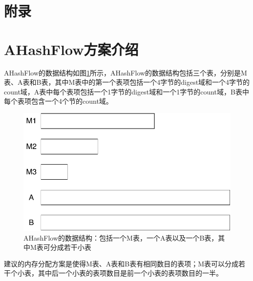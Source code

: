 \documentclass{article}
\begin{document}
\appendix
\section*{附录}
\section{AHashFlow方案介绍}
AHashFlow的数据结构如图\ref{fig:ahashflow}所示，AHashFlow的数据结构包括三个表，分别是M表、A表和B表，其中M表中的第一个表项包括一个4字节的digest域和一个4字节的count域，A表中每个表项包括一个1字节的digest域和一个1字节的count域，B表中每个表项包含一个4个节的count域。
\begin{figure}[ht!]
	\centering
	\includegraphics[width=0.7\linewidth]{./figures/AHashFlowDataStructure/AHashFlow}
	\caption{AHashFlow的数据结构：包括一个M表，一个A表以及一个B表，其中M表可分成若干小表}
	\label{fig:ahashflow}
\end{figure}

建议的内存分配方案是使得M表、A表和B表有相同数目的表项；M表可以分成若干个小表，其中后一个小表的表项数目是前一个小表的表项数目的一半。



\begin{algorithm}[ht!]
	\caption{$promote(idx, digest, cnt)$}
	\label{alg: promote}
	\begin{algorithmic}[1]
	\end{algorithmic}
\end{algorithm}
\end{document}
